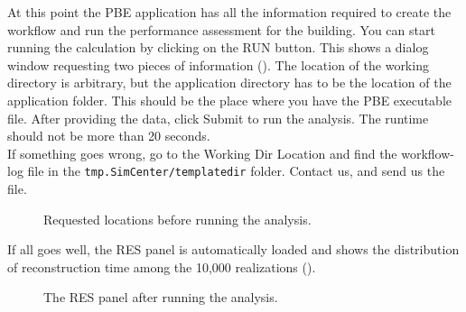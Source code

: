 At this point the PBE application has all the information required to create the workflow and run the performance assessment for the building. You can start running the calculation by clicking on the RUN button. This shows a dialog window requesting two pieces of information (). The location of the working directory is arbitrary, but the application directory has to be the location of the application folder. This should be the place where you have the PBE executable file. After providing the data, click Submit to run the analysis. The runtime should not be more than 20 seconds. \\

If something goes wrong, go to the Working Dir Location and find the workflow-log file in the \texttt{tmp.SimCenter/templatedir} folder. Contact us, and send us the file.\\

\begin{figure}[!htbp]
  \caption{Requested locations before running the analysis.}
  \label{fig:ex_1_RUN}
\end{figure}

If all goes well, the RES panel is automatically loaded and shows the distribution of reconstruction time among the 10,000 realizations ().\\

\begin{figure}[!htbp]
  \caption{The RES panel after running the analysis.}
  \label{fig:ex_1_RES_1}
\end{figure}

